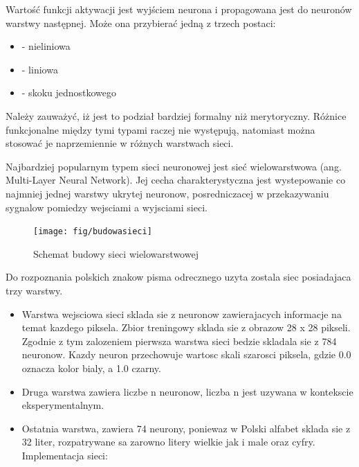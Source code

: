 \documentclass[brudnopis]{xmgr}
\begin{document}
Wartość funkcji aktywacji jest wyjściem neurona i propagowana jest do neuronów warstwy następnej. Może ona przybierać jedną z trzech postaci:
\begin{itemize}
\item
- nieliniowa
\item
- liniowa
\item
- skoku jednostkowego
\end{itemize}

Należy zauważyć, iż jest to podział bardziej formalny niż merytoryczny. Różnice funkcjonalne między tymi typami raczej nie występują, natomiast można stosować je naprzemiennie w różnych warstwach sieci.

Najbardziej popularnym typem sieci neuronowej jest sieć wielowarstwowa (ang. Multi-Layer Neural Network). Jej cecha charakterystyczna jest wystepowanie co najmniej jednej warstwy ukrytej neuronow, posredniczacej w przekazywaniu sygnalow pomiedzy wejsciami a wyjsciami sieci.

\begin{figure}[!tbh]
\centering
\texttt{[image: fig/budowasieci]}
\caption{Schemat budowy sieci wielowarstwowej}
\end{figure}
\newpage

Do rozpoznania polskich znakow pisma odrecznego uzyta zostala siec posiadajaca trzy warstwy.

\begin{itemize}
\item
Warstwa wejsciowa sieci sklada sie z neuronow zawierajacych informacje na temat kazdego piksela. Zbior treningowy sklada sie z obrazow 28 x 28 pikseli. Zgodnie z tym zalozeniem pierwsza warstwa sieci bedzie skladala sie z 784 neuronow. Kazdy neuron przechowuje wartosc skali szarosci piksela, gdzie 0.0 oznacza kolor bialy, a 1.0 czarny.
\item
Druga warstwa zawiera liczbe n neuronow, liczba n jest uzywana w kontekscie eksperymentalnym.
\item
Ostatnia warstwa, zawiera 74 neurony, poniewaz w Polski alfabet sklada sie z 32 liter, rozpatrywane sa zarowno litery wielkie jak i male oraz cyfry. Implementacja sieci:
\end{itemize}
\end{document}
